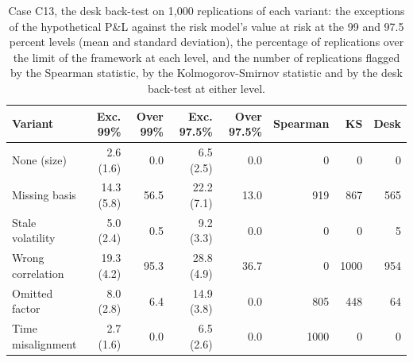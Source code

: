 \begin{table}[htbp]
\centering
\scriptsize
\setlength{\tabcolsep}{2.0pt}
\caption{Case C13, the desk back-test on 1,000 replications of each variant: the exceptions of the hypothetical P\&L against the risk model's value at risk at the 99 and 97.5 percent levels (mean and standard deviation), the percentage of replications over the limit of the framework at each level, and the number of replications flagged by the Spearman statistic, by the Kolmogorov-Smirnov statistic and by the desk back-test at either level.}
\label{tab:market-desk}
\begin{tabular}{lrrrrrrr}
\toprule
Variant & Exc. 99\% & Over 99\% & Exc. 97.5\% & Over 97.5\% & Spearman & KS & Desk \\
\midrule
None (size) & 2.6 (1.6) & 0.0 & 6.5 (2.5) & 0.0 & 0 & 0 & 0 \\
Missing basis & 14.3 (5.8) & 56.5 & 22.2 (7.1) & 13.0 & 919 & 867 & 565 \\
Stale volatility & 5.0 (2.4) & 0.5 & 9.2 (3.3) & 0.0 & 0 & 0 & 5 \\
Wrong correlation & 19.3 (4.2) & 95.3 & 28.8 (4.9) & 36.7 & 0 & 1000 & 954 \\
Omitted factor & 8.0 (2.8) & 6.4 & 14.9 (3.8) & 0.0 & 805 & 448 & 64 \\
Time misalignment & 2.7 (1.6) & 0.0 & 6.5 (2.6) & 0.0 & 1000 & 0 & 0 \\
\bottomrule
\end{tabular}
\end{table}
